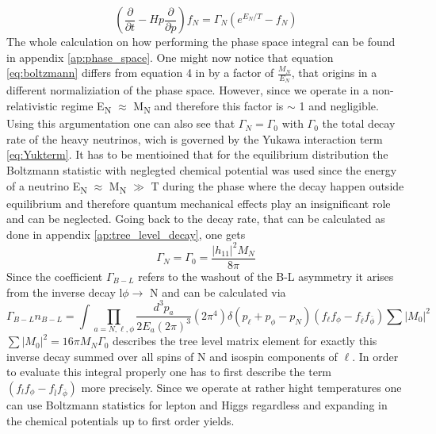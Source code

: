 \begin{equation}
	\left(\frac{\partial}{\partial t}-Hp\frac{\partial}{\partial p}\right)f_N=\Gamma_N\left(e^{E_N/T}-f_N\right)
	\label{eq:boltzmann}
\end{equation}
The whole calculation on how performing the phase space integral can be found in appendix \ref{ap:phase_space}. \newline
One might now notice that equation \ref{eq:boltzmann} differs from equation 4 in \cite{Bodeker:2013qaa} by a factor of $\frac{M_N}{E_N}$, that origins in a different normaliziation of the phase space. However, since we operate in a non-relativistic regime E\textsubscript{N} $\approx$ M\textsubscript{N} and therefore this factor is $\sim$ 1 and negligible. Using this argumentation one can also see that $\Gamma_N=\Gamma_0$ with $\Gamma_0$ the total decay rate of the heavy neutrinos, wich is governed by the Yukawa interaction term \ref{eq:Yukterm}. It has to be mentioined that for the equilibrium distribution the Boltzmann statistic with neglegted chemical potential was used since the energy of a neutrino E\textsubscript{N} $\approx$ M\textsubscript{N} $\gg$ T during the phase where the decay happen outside equilibrium and therefore quantum mechanical effects play an insignificant role and can be neglected. Going back to the decay rate, that can be calculated as done in appendix \ref{ap:tree_level_decay}, one gets
\begin{equation}
\Gamma_N=\Gamma_0=\frac{|h_{11}|^2M_N}{8\pi}
\label{eq:Gamma_N}
\end{equation}
Since the coefficient $\Gamma_{B-L}$ refers to the washout of the B-L asymmetry it arises from the inverse decay l$\phi\rightarrow$ N and can be calculated via 
\begin{equation}
\Gamma_{B-L}n_{B-L}=\int\prod_{a=N,\ell,\phi}\frac{d^3p_a}{2E_a(2\pi)^3}(2\pi^4)\delta(p_\ell+p_\phi-p_N)(	f_\ell f_\phi-f_{\bar{\ell}}f_{\bar{\phi}})\sum|M_0|^2
\label{eq:Gamma_B-L}
\end{equation}
$\sum|M_0|^2=16\pi M_N\Gamma_0$ describes the tree level matrix element for exactly this inverse decay summed over all spins of N and isospin components of $\ell$. In order to evaluate this integral properly one has to first describe the term $(	f_lf_\phi-f_{\bar{l}}f_{\bar{\phi}})$ more precisely. Since we operate at rather hight temperatures one can use Boltzmann statistics for lepton and Higgs regardless and expanding in the chemical potentials up to first order yields.
